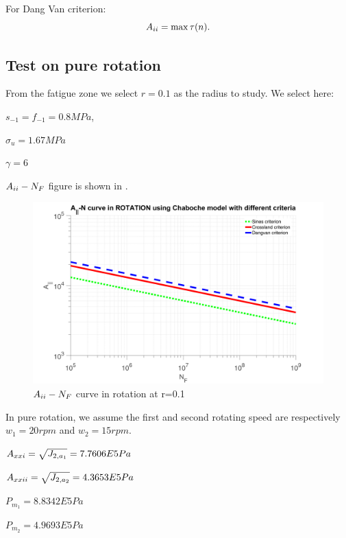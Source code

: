 For Dang Van criterion:
$$A_{\uppercase\expandafter{\romannumeral2}}= \max\tau(n).$$ 


\subsection{Test on pure rotation}

From the fatigue zone we select $r=0.1$ as the radius to study. We select here:

$s_{-1}=f_{-1}=0.8MPa$,

$\sigma_{u}=1.67MPa$ 

$\gamma=6$


$A_{\uppercase\expandafter{\romannumeral2}}-N_F$ figure is shown in . 
\begin{figure}[!h]
	\centering
	\includegraphics[width=\textwidth]{figures//JNrotation.png} 
	\caption{$A_{\uppercase\expandafter{\romannumeral2}}-N_F$ curve in rotation at r=0.1}
	\label{JNrotation}
\end{figure}

In pure rotation, we assume the first and second rotating speed are respectively $w_1=20rpm$ and $w_2=15rpm$.  

\vspace{6pt}
$A_{\uppercase\expandafter{\romannumeral2}1}=\sqrt{J_{2,a_1}}=7.7606E5 Pa$

\vspace{6pt}
$A_{\uppercase\expandafter{\romannumeral2}2}=\sqrt{J_{2,a_2}}=4.3653E5 Pa$

\vspace{6pt}
$P_{m_1}=8.8342E5 Pa$

\vspace{6pt}
$P_{m_2}=4.9693E5 Pa$

